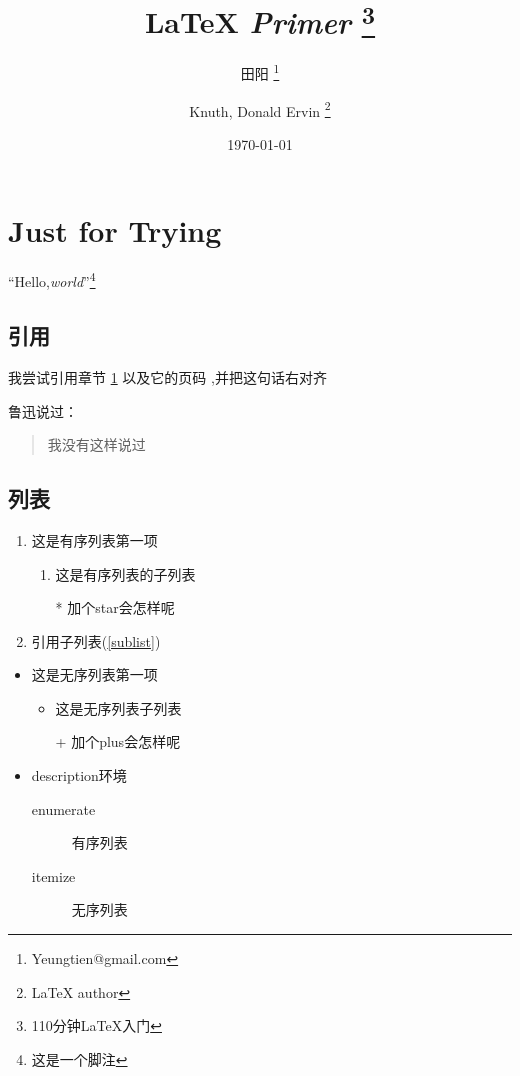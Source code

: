 \documentclass[,UTF8,titlepage]{ctexart}
\title{\LaTeX{} \emph{Primer} \thanks{110分钟\LaTeX{}入门}}
\author{田阳 \thanks{Yeungtien@gmail.com}
\and Knuth, Donald Ervin \thanks{\LaTeX{} author}}
\date{\today}
\begin{document}
\maketitle
{}
\newpage
\thispagestyle{empty}
\tableofcontents
\newpage
\setcounter{page}{1}
\section{Just for Trying} \label{one}
\begin{center}
    ``Hello,\emph{world}''\footnote{这是一个脚注} \par
\end{center}
\subsection{引用}
\begin{flushright}
    我尝试引用章节 \ref{one} 以及它的页码 \pageref{one},并把这句话右对齐 
\end{flushright}
鲁迅说过：\par
\begin{quotation}
    我没有这样说过 
\end{quotation}
\subsection{列表}
\begin{enumerate}
\item 这是有序列表第一项
    \begin{enumerate}
       \item 这是有序列表的子列表 \label{sublist}
       \item[*] 加个star会怎样呢 
    \end{enumerate}
\item 引用子列表(\ref{sublist})
\end{enumerate}
\begin{itemize}
    \item 这是无序列表第一项
    \begin{itemize}
        \item 这是无序列表子列表
        \item[+] 加个plus会怎样呢
    \end{itemize}
    \item description环境
    \begin{description}
        \item[enumerate] 有序列表
        \item[itemize] 无序列表
    \end{description}
\end{itemize}
\end{document}
